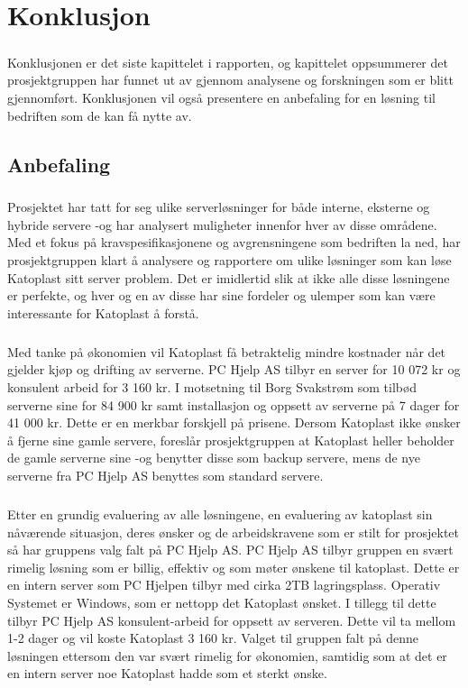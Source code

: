 \chapter{Konklusjon}
\paragraph{} Konklusjonen er det siste kapittelet i rapporten, og kapittelet oppsummerer det prosjektgruppen har funnet ut av gjennom analysene og forskningen som er blitt gjennomført. Konklusjonen vil også presentere en anbefaling for en løsning til bedriften som de kan få nytte av. 

\section{Anbefaling}
\paragraph{} Prosjektet har tatt for seg ulike serverløsninger for både interne, eksterne og hybride servere -og har analysert muligheter innenfor hver av disse områdene. Med et fokus på kravspesifikasjonene og avgrensningene som bedriften la ned, har prosjektgruppen klart å analysere og rapportere om ulike løsninger som kan løse Katoplast sitt server problem. Det er imidlertid slik at ikke alle disse løsningene er perfekte, og hver og en av disse har sine fordeler og ulemper som kan være interessante for Katoplast å forstå.

\paragraph{} Med tanke på økonomien vil Katoplast få betraktelig mindre kostnader når det gjelder kjøp og drifting av serverne. PC Hjelp AS tilbyr en server for 10 072 kr og konsulent arbeid for 3 160 kr. I motsetning til Borg Svakstrøm som tilbød serverne sine for 84 900 kr samt installasjon og oppsett av serverne på 7 dager for 41 000 kr. Dette er en merkbar forskjell på prisene. Dersom Katoplast ikke ønsker å fjerne sine gamle servere, foreslår prosjektgruppen at Katoplast heller beholder de gamle serverne sine -og benytter disse som backup servere, mens de nye serverne fra PC Hjelp AS benyttes som standard servere.

\paragraph{} Etter en grundig evaluering av alle løsningene, en evaluering av katoplast sin nåværende situasjon, deres ønsker og de arbeidskravene som er stilt for prosjektet så har gruppens valg falt på PC Hjelp AS. PC Hjelp AS tilbyr gruppen en svært rimelig løsning som er billig, effektiv og som møter ønskene til katoplast. Dette er en intern server som PC Hjelpen tilbyr med cirka 2TB lagringsplass. Operativ Systemet er Windows, som er nettopp det Katoplast ønsket. I tillegg til dette tilbyr PC Hjelp AS konsulent-arbeid for oppsett av serveren. Dette vil ta mellom 1-2 dager og vil koste Katoplast 3 160 kr. Valget til gruppen falt på denne løsningen ettersom den var svært rimelig for økonomien, samtidig som at det er en intern server noe Katoplast hadde som et sterkt ønske. 